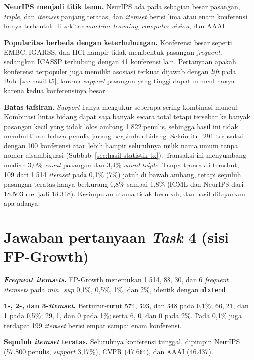 \textbf{NeurIPS menjadi titik temu.} NeurIPS ada pada sebagian besar pasangan, \textit{triple}, dan \textit{itemset} panjang teratas, dan \textit{itemset} berisi lima atau enam konferensi hanya terbentuk di sekitar \textit{machine learning}, \textit{computer vision}, dan AAAI.

\textbf{Popularitas berbeda dengan keterhubungan.} Konferensi besar seperti EMBC, IGARSS, dan HCI hampir tidak membentuk pasangan \textit{frequent}, sedangkan ICASSP terhubung dengan 41 konferensi lain. Pertanyaan apakah konferensi terpopuler juga memiliki asosiasi terkuat dijawab dengan \textit{lift} pada Bab~\ref{sec:hasil-t5}, karena \textit{support} pasangan yang tinggi dapat muncul hanya karena kedua konferensinya besar.

\textbf{Batas tafsiran.} \textit{Support} hanya mengukur seberapa sering kombinasi muncul. Kombinasi lintas bidang dapat saja banyak secara total tetapi tersebar ke banyak pasangan kecil yang tidak lolos ambang 1.822 penulis, sehingga hasil ini tidak membuktikan bahwa penulis jarang berpindah bidang. Selain itu, 291 transaksi dengan 100 konferensi atau lebih hampir seluruhnya milik nama umum tanpa nomor disambiguasi (Subbab~\ref{sec:hasil-statistik-tx}). Transaksi ini menyumbang median 3,0\% \textit{count} pasangan dan 3,9\% \textit{count} \textit{triple}. Tanpa transaksi tersebut, 109 dari 1.514 \textit{itemset} pada 0,1\% (7\%) jatuh di bawah ambang, tetapi sepuluh pasangan teratas hanya berkurang 0,8\% sampai 1,8\% (ICML dan NeurIPS dari 18.503 menjadi 18.348). Kesimpulan utama tidak berubah, dan hasil dilaporkan apa adanya.

\section{Jawaban pertanyaan \textit{Task} 4 (sisi FP-Growth)}
\label{sec:jawab-t4-fp}
\textbf{\textit{Frequent itemsets}.} FP-Growth menemukan 1.514, 88, 30, dan 6 \textit{frequent itemsets} pada \textit{min\_sup} 0,1\%, 0,5\%, 1\%, dan 2\%, identik dengan \texttt{mlxtend}.

\textbf{1-, 2-, dan 3-\textit{itemset}.} Berturut-turut 574, 393, dan 348 pada 0,1\%; 66, 21, dan 1 pada 0,5\%; 29, 1, dan 0 pada 1\%; serta 6, 0, dan 0 pada 2\%. Pada 0,1\% juga terdapat 199 \textit{itemset} berisi empat sampai enam konferensi.

\textbf{Sepuluh \textit{itemset} teratas.} Seluruhnya konferensi tunggal, dipimpin NeurIPS (57.800 penulis, \textit{support} 3,17\%), CVPR (47.664), dan AAAI (46.437).

